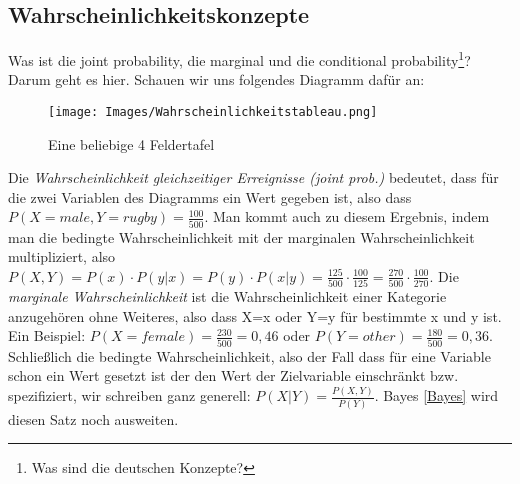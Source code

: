 \documentclass{scrreprt}
\begin{document}
\subsection{Wahrscheinlichkeitskonzepte}\label{Wahrscheinlichkeitskonzepte}
Was ist die joint probability, die marginal und die conditional probability\footnote{Was sind die deutschen Konzepte?}? Darum geht es hier. Schauen wir uns folgendes Diagramm dafür an:
\begin{figure}[h]
    \centering
    \texttt{[image: Images/Wahrscheinlichkeitstableau.png]}
    \caption{Eine beliebige 4 Feldertafel}
\end{figure}  
Die \textit{Wahrscheinlichkeit gleichzeitiger Erreignisse (joint prob.)} bedeutet, dass für die zwei Variablen des Diagramms ein Wert gegeben ist, also dass $P(X=male, Y=rugby)=\frac{100}{500}$. Man kommt auch zu diesem Ergebnis, indem man die bedingte Wahrscheinlichkeit mit der marginalen Wahrscheinlichkeit multipliziert, also $P(X,Y)=P(x)\cdot P(y|x)=P(y)\cdot P(x|y)=\frac{125}{500}\cdot \frac{100}{125}=\frac{270}{500}\cdot \frac{100}{270}$. Die \textit{marginale Wahrscheinlichkeit} ist die Wahrscheinlichkeit einer Kategorie anzugehören ohne Weiteres, also dass X=x oder Y=y für bestimmte x und y ist. Ein Beispiel: $P(X=female)=\frac{230}{500}=0,46$ oder $P(Y=other)=\frac{180}{500}=0,36$. Schließlich die bedingte Wahrscheinlichkeit, also der Fall dass für eine Variable schon ein Wert gesetzt ist der den Wert der Zielvariable einschränkt bzw. spezifiziert, wir schreiben ganz generell: $P(X|Y)=\frac{P(X,Y)}{P(Y)}$. Bayes \ref{Bayes} wird diesen Satz noch ausweiten.
\end{document}
